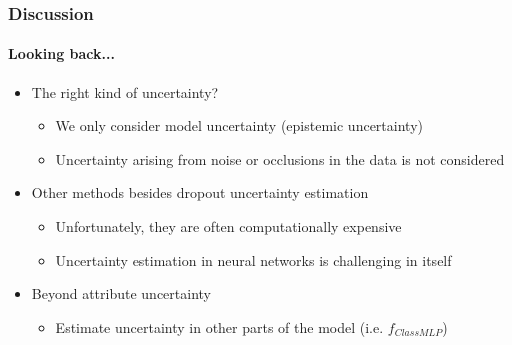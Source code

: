 \documentclass[9pt]{beamer}
\begin{document}
\begin{frame}
\frametitle{Discussion}
\framesubtitle{Looking back...}
\begin{itemize}
	\item The right kind of uncertainty?
	\begin{itemize}
		\item We only consider model uncertainty (epistemic uncertainty)
		\item Uncertainty arising from noise or occlusions in the data is not considered
	\end{itemize}
	\item Other methods besides dropout uncertainty estimation
	\begin{itemize}
		\item Unfortunately, they are often computationally expensive
		\item Uncertainty estimation in neural networks is challenging in itself
	\end{itemize}
	\item Beyond attribute uncertainty
	\begin{itemize}
		\item Estimate uncertainty in other parts of the model (i.e. $f_{ClassMLP}$)
	\end{itemize}
\end{itemize}
\end{frame} 
\end{document}
